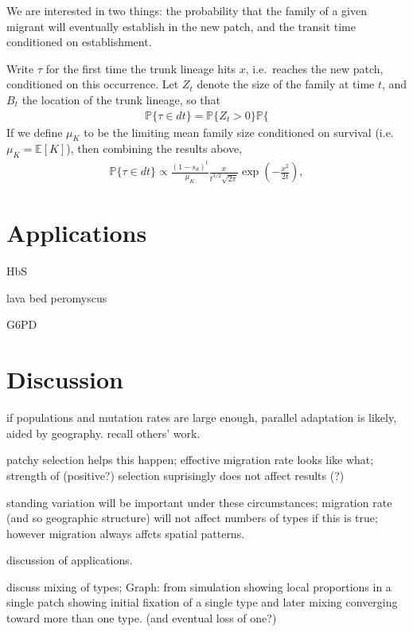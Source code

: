 \documentclass{article}
\renewcommand{\P}{\mathbb{P}}
\newcommand{\E}{\mathbb{E}}
\begin{document}
We are interested in two things: the probability that the family of a given migrant will eventually establish in the new patch,
and the transit time conditioned on establishment.

Write $\tau$ for the first time the trunk lineage hits $x$, i.e.\ reaches the new patch, 
conditioned on this occurrence.
Let $Z_t$ denote the size of the family at time $t$,
and $B_t$ the location of the trunk lineage,
so that
\begin{align}
  \P\{\tau \in dt\} = \P\{ Z_t>0 \} \P\{ 
\end{align}
If we define $\mu_K$ to be the limiting mean family size conditioned on survival
(i.e.\ $\mu_K = \E[K]$), then combining the results above,
\begin{align}
  \P\{ \tau \in dt \} \propto 
  \frac{(1-s_d)^t}{\mu_K} \frac{x}{t^{3/2}\sqrt{2\pi}} \exp\left(-\frac{x^2}{2t}\right) ,
\end{align}



\section{Applications} 

HbS

lava bed peromyscus

G6PD

\section{Discussion} 

if populations and mutation rates are large enough, parallel adaptation is likely, aided by geography. 
recall others' work. 

patchy selection helps this happen; 
effective migration rate looks like what; 
strength of (positive?) selection suprisingly does not affect results (?) 

standing variation will be important under these circumstances; 
migration rate (and so geographic structure) will not affect numbers of types if this is true; 
however migration always affcts spatial patterns. 

discussion of applications. 

discuss mixing of types; 
Graph: from simulation showing local proportions in a single patch showing initial fixation of a single type and later mixing converging toward more than one type.  (and eventual loss of one?)
\end{document}
